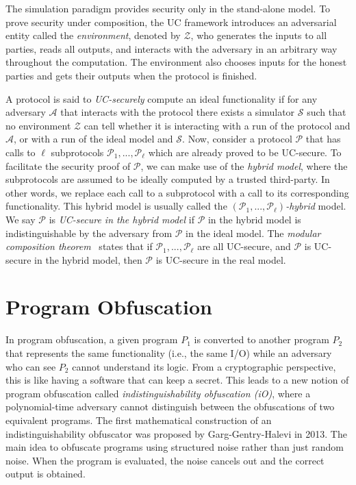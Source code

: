 \documentclass[11pt]{article}
\theoremstyle{plain}
\begin{document}
The simulation paradigm provides security only in the stand-alone
model. To prove security under composition, the UC framework introduces
an adversarial entity called the \emph{environment}, denoted by $\mathcal{Z}$,
who generates the inputs to all parties, reads all outputs, and interacts
with the adversary in an arbitrary way throughout the computation.
The environment also chooses inputs for the honest parties and gets
their outputs when the protocol is finished.

A protocol is said to \emph{UC-securely} compute an ideal functionality
if for any adversary $\mathcal{A}$ that interacts with the protocol
there exists a simulator $\mathcal{S}$ such that no environment $\mathcal{Z}$
can tell whether it is interacting with a run of the protocol and
$\mathcal{A}$, or with a run of the ideal model and $\mathcal{S}$.
Now, consider a protocol $\mathcal{P}$ that has calls to $\ell$
subprotocols $\mathcal{P}_{1},...,\mathcal{P}_{\ell}$ which are already
proved to be UC-secure. To facilitate the security proof of $\mathcal{P}$,
we can make use of the \emph{hybrid model}, where the subprotocols
are assumed to be ideally computed by a trusted third-party. In other
words, we replace each call to a subprotocol with a call to its corresponding
functionality. This hybrid model is usually called the \emph{$(\mathcal{P}_{1},...,\mathcal{P}_{\ell})$-hybrid}
model. We say $\mathcal{P}$ is \emph{UC-secure in the hybrid model}
if $\mathcal{P}$ in the hybrid model is indistinguishable by the
adversary from $\mathcal{P}$ in the ideal model. The \emph{modular
	composition theorem}~\cite{Canetti:2000:JC:0933-2790} states that
if $\mathcal{P}_{1},...,\mathcal{P}_{\ell}$ are all UC-secure, and
$\mathcal{P}$ is UC-secure in the hybrid model, then $\mathcal{P}$
is UC-secure in the real model.

\section{Program Obfuscation}

In program obfuscation, a given program $P_{1}$ is converted to another
program $P_{2}$ that represents the same functionality (i.e., the
same I/O) while an adversary who can see $P_{2}$ cannot understand
its logic. From a cryptographic perspective, this is like having a
software that can keep a secret. This leads to a new notion of program
obfuscation called \emph{indistinguishability obfuscation (iO)}, where
a polynomial-time adversary cannot distinguish between the obfuscations
of two equivalent programs. The first mathematical construction of
an indistinguishability obfuscator was proposed by Garg-Gentry-Halevi
in 2013. The main idea to obfuscate programs using structured noise
rather than just random noise. When the program is evaluated, the
noise cancels out and the correct output is obtained. 
\end{document}
